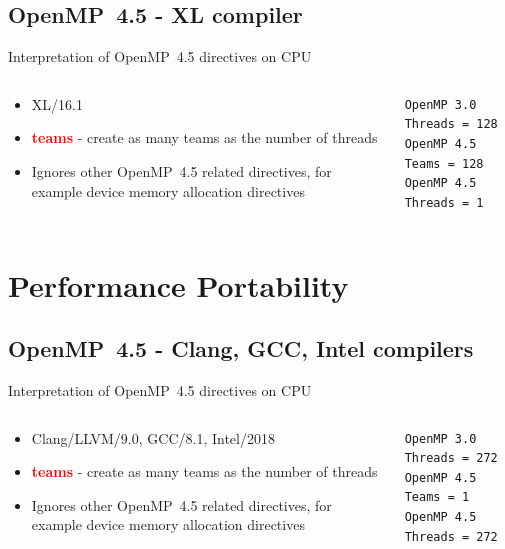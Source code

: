 \documentclass[xcolor=dvipsnames,compress,10pt]{nersc}
\begin{document}
\subsection{OpenMP~4.5 - XL compiler}
\begin{frame}[fragile]{Interpretation of OpenMP~4.5 directives on CPU}
\begin{columns}[t]
\begin{column}{.48\textwidth}
\begin{itemize}
    \setlength\itemsep{1.5em}
    \item XL/16.1
    \item \textcolor{red}{\textbf{teams}} - create as many teams as the number of threads
    \item Ignores other OpenMP~4.5 related directives, for example device memory allocation directives
\end{itemize}
\end{column}
\begin{column}{.48\textwidth}
\begin{lstlisting}[style=cleanText]
OpenMP 3.0 Threads = 128
OpenMP 4.5 Teams = 128
OpenMP 4.5 Threads = 1
\end{lstlisting}
\end{column}
\end{columns}
\end{frame}

\section{Performance Portability}
\subsection{OpenMP~4.5 - Clang, GCC, Intel compilers}
\begin{frame}[fragile]{Interpretation of OpenMP~4.5 directives on CPU}
\begin{columns}[t]
\begin{column}{.48\textwidth}
\begin{itemize}
    \setlength\itemsep{1.5em}
    \item Clang/LLVM/9.0, GCC/8.1, Intel/2018
    \item \textcolor{red}{\textbf{teams}} - create as many teams as the number of threads
    \item Ignores other OpenMP~4.5 related directives, for example device memory allocation directives
\end{itemize}
\end{column}
\begin{column}{.48\textwidth}
\begin{lstlisting}[style=cleanText]
OpenMP 3.0 Threads = 272
OpenMP 4.5 Teams = 1
OpenMP 4.5 Threads = 272
\end{lstlisting}
\end{column}
\end{columns}
\end{frame}
\end{document}
